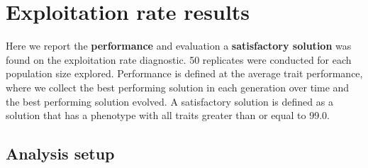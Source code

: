 \documentclass[
]{book}
\begin{document}
\hypertarget{exploitation-rate-results}{%
\chapter{Exploitation rate results}\label{exploitation-rate-results}}

Here we report the \textbf{performance} and evaluation a \textbf{satisfactory solution} was found on the exploitation rate diagnostic.
50 replicates were conducted for each population size explored.
Performance is defined at the average trait performance, where we collect the best performing solution in each generation over time and the best performing solution evolved.
A satisfactory solution is defined as a solution that has a phenotype with all traits greater than or equal to 99.0.

\hypertarget{analysis-setup}{%
\section{Analysis setup}\label{analysis-setup}}
\end{document}
